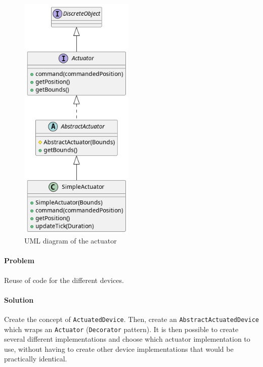 \begin{figure}[H]
\centering{}
\includegraphics[width=\textwidth,height=12cm,keepaspectratio]{magnani/uml/actuator.png}
\caption{UML diagram of the actuator}
\label{magnani:uml:actuator}
\end{figure}

\paragraph{Problem} Reuse of code for the different devices.
\paragraph{Solution} Create the concept of \texttt{ActuatedDevice}. Then, create an \texttt{AbstractActuatedDevice}
which wraps an \texttt{Actuator} (\texttt{Decorator} pattern).
It is then possible to create several different implementations and choose which actuator implementation to use,
without having to create other device implementations that would be practically identical.


